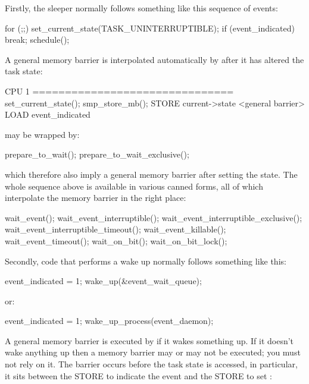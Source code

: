 Firstly, the sleeper normally follows something like this sequence of events:

\begin{VerbatimU}
	for (;;) {
		set_current_state(TASK_UNINTERRUPTIBLE);
		if (event_indicated)
			break;
		schedule();
	}
\end{VerbatimU}

A general memory barrier is interpolated automatically by
 after it has altered the task state:

\begin{VerbatimU}
	CPU 1
	===============================
	set_current_state();
	  smp_store_mb();
	    STORE current->state
	    <general barrier>
	LOAD event_indicated
\end{VerbatimU}

 may be wrapped by:

\begin{VerbatimU}
	prepare_to_wait();
	prepare_to_wait_exclusive();
\end{VerbatimU}

\noindent%
which therefore also imply a general memory barrier after setting the state.
The whole sequence above is available in various canned forms, all of which
interpolate the memory barrier in the right place:

\begin{VerbatimU}
	wait_event();
	wait_event_interruptible();
	wait_event_interruptible_exclusive();
	wait_event_interruptible_timeout();
	wait_event_killable();
	wait_event_timeout();
	wait_on_bit();
	wait_on_bit_lock();
\end{VerbatimU}

Secondly, code that performs a wake up normally follows something like this:

\begin{VerbatimU}
	event_indicated = 1;
	wake_up(&event_wait_queue);
\end{VerbatimU}

\noindent%
or:

\begin{VerbatimU}
	event_indicated = 1;
	wake_up_process(event_daemon);
\end{VerbatimU}

A general memory barrier is executed by  if it wakes something up.
If it doesn't wake anything up then a memory barrier may or may not be
executed; you must not rely on it.
The barrier occurs before the task state is accessed, in particular, it sits
between the STORE to indicate the event and the STORE to set :

